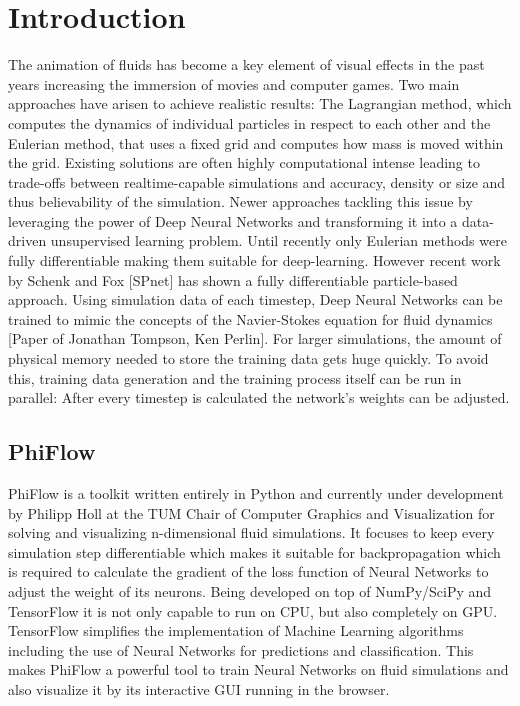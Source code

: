 \chapter{Introduction}\label{chapter:introduction}
The animation of fluids has become a key element of visual effects in the past years increasing the immersion of movies and computer games. Two main approaches have arisen to achieve realistic results: The Lagrangian method, which computes the dynamics of individual particles in respect to each other and the Eulerian method, that uses a fixed grid and computes how mass is moved within the grid. Existing solutions are often highly computational intense leading to trade-offs between realtime-capable simulations and accuracy, density or size and thus believability of the simulation. Newer approaches tackling this issue by leveraging the power of Deep Neural Networks and transforming it into a data-driven unsupervised learning problem. Until recently only Eulerian methods were fully differentiable making them suitable for deep-learning. However recent work by Schenk and Fox [SPnet] has shown a fully differentiable particle-based approach. Using simulation data of each timestep, Deep Neural Networks can be trained to mimic the concepts of the Navier-Stokes equation for fluid dynamics [Paper of Jonathan Tompson, Ken Perlin]. For larger simulations, the amount of physical memory needed to store the training data gets huge quickly. To avoid this, training data generation and the training process itself can be run in parallel: After every timestep is calculated the network's weights can be adjusted.
\section{PhiFlow}
PhiFlow is a toolkit written entirely in Python and currently under development by Philipp Holl at the TUM Chair of Computer Graphics and Visualization for solving and visualizing n-dimensional fluid simulations. It focuses to keep every simulation step differentiable which makes it suitable for backpropagation which is required to calculate the gradient of the loss function of Neural Networks to adjust the weight of its neurons. Being developed on top of NumPy/SciPy and TensorFlow it is not only capable to run on CPU, but also completely on GPU. TensorFlow simplifies the implementation of Machine Learning algorithms including the use of Neural Networks for predictions and classification. This makes PhiFlow a powerful tool to train Neural Networks on fluid simulations and also visualize it by its interactive GUI running in the browser. 
